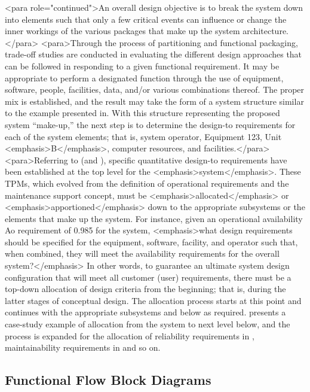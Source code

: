 <para role="continued">An overall design objective is to break the system down into elements such that only a few critical events can influence or change the inner workings of the various packages that make up the system architecture.</para>
<para>Through the process of partitioning and functional packaging, trade-off studies are conducted in evaluating the different design approaches that can be followed in responding to a given functional requirement. It may be appropriate to perform a designated function through the use of equipment, software, people, facilities, data, and/or various combinations thereof. The proper mix is established, and the result may take the form of a system structure similar to the example presented in. With this structure representing the proposed system “make-up,” the next step is to determine the design-to requirements for each of the system elements; that is, system operator, Equipment 123, Unit <emphasis>B</emphasis>, computer resources, and facilities.</para>
<para>Referring to (and ), specific quantitative design-to requirements have been established at the top level for the <emphasis>system</emphasis>. These TPMs, which evolved from the definition of operational requirements and the maintenance support concept, must be <emphasis>allocated</emphasis> or <emphasis>apportioned</emphasis> down to the appropriate subsystems or the elements that make up the system. For instance, given an operational availability Ao requirement of 0.985 for the system, <emphasis>what design requirements should be specified for the equipment, software, facility, and operator such that, when combined, they will meet the availability requirements for the overall system?</emphasis> In other words, to guarantee an ultimate system design configuration that will meet all customer (user) requirements, there must be a top-down allocation of design criteria from the beginning; that is, during the latter stages of conceptual design. The allocation process starts at this point and continues with the appropriate subsystems and below as required. presents a case-study example of allocation from the system to next level below, and the process is expanded for the allocation of reliability requirements in , maintainability requirements in and so on.

\subsection{Functional Flow Block Diagrams}

